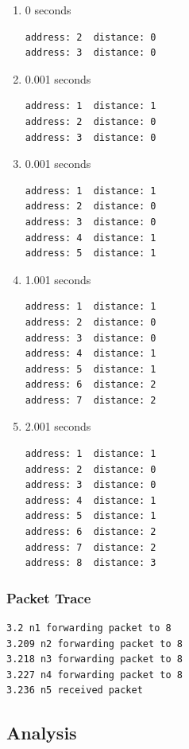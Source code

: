 \documentclass[fleqn,11pt]{article}
\begin{document}
	\begin{enumerate}
	\item 0 seconds
\begin{lstlisting}
address: 2	distance: 0
address: 3	distance: 0
\end{lstlisting}
	
	\item 0.001 seconds
	
\begin{lstlisting}
address: 1	distance: 1
address: 2	distance: 0
address: 3	distance: 0
\end{lstlisting}
	 
	 \item 0.001 seconds
	 
\begin{lstlisting}
address: 1	distance: 1
address: 2	distance: 0
address: 3	distance: 0
address: 4	distance: 1
address: 5	distance: 1
\end{lstlisting}

	\item 1.001 seconds
	
\begin{lstlisting}
address: 1	distance: 1
address: 2	distance: 0
address: 3	distance: 0
address: 4	distance: 1
address: 5	distance: 1
address: 6	distance: 2
address: 7	distance: 2
\end{lstlisting}
	
	\item 2.001 seconds
	
\begin{lstlisting}
address: 1	distance: 1
address: 2	distance: 0
address: 3	distance: 0
address: 4	distance: 1
address: 5	distance: 1
address: 6	distance: 2
address: 7	distance: 2
address: 8	distance: 3
\end{lstlisting}
	
	\end{enumerate}
	
	\subsubsection{Packet Trace}
	
\begin{lstlisting}
3.2 n1 forwarding packet to 8
3.209 n2 forwarding packet to 8
3.218 n3 forwarding packet to 8
3.227 n4 forwarding packet to 8
3.236 n5 received packet
\end{lstlisting}
	
	\subsection{Analysis}
	
\end{document}
